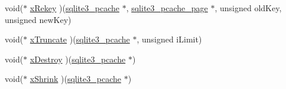 \begin{DoxyCompactItemize}
\item 
void($\ast$ \hyperlink{structsqlite3__pcache__methods2_a28a22927b108182e22025bbe6ba1f68e}{x\-Rekey} )(\hyperlink{sqlite3_8c_a096c453d937d51f7926d7d31c8e0bd2f}{sqlite3\-\_\-pcache} $\ast$, \hyperlink{structsqlite3__pcache__page}{sqlite3\-\_\-pcache\-\_\-page} $\ast$, unsigned old\-Key, unsigned new\-Key)
\item 
void($\ast$ \hyperlink{structsqlite3__pcache__methods2_a7c565709ab91dbe7feb5b82c684ba604}{x\-Truncate} )(\hyperlink{sqlite3_8c_a096c453d937d51f7926d7d31c8e0bd2f}{sqlite3\-\_\-pcache} $\ast$, unsigned i\-Limit)
\item 
void($\ast$ \hyperlink{structsqlite3__pcache__methods2_a144d6e899889e80e00f93fb6c83359e2}{x\-Destroy} )(\hyperlink{sqlite3_8c_a096c453d937d51f7926d7d31c8e0bd2f}{sqlite3\-\_\-pcache} $\ast$)
\item 
void($\ast$ \hyperlink{structsqlite3__pcache__methods2_af00c121e9c39b1df292711013c226ba5}{x\-Shrink} )(\hyperlink{sqlite3_8c_a096c453d937d51f7926d7d31c8e0bd2f}{sqlite3\-\_\-pcache} $\ast$)
\end{DoxyCompactItemize}


